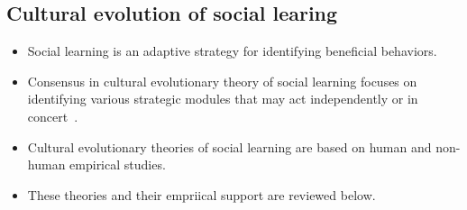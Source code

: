 \documentclass[10pt,letterpaper]{article}
\begin{document}
\subsection{Cultural evolution of social learing}
    \begin{itemize}
      \item 
        Social learning is an adaptive strategy for identifying beneficial behaviors.
      \item
        Consensus in cultural evolutionary theory of social learning focuses on
        identifying various strategic modules that may act independently or
        in concert~\cite[see Figure 1]{Kendal2018}.
      \item
        Cultural evolutionary theories of social learning are based on human
        and non-human empirical studies.
      \item
        These theories and their empriical support are reviewed below.
    \end{itemize}
\end{document}

